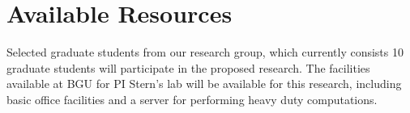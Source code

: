 \documentclass[11pt]{article}
\begin{document}

\section{Available Resources}
Selected graduate students from our research group, which  currently consists 10 graduate students will participate in the proposed research. The facilities available at BGU for PI Stern's lab will be available for this research, including basic office facilities and a server for performing heavy duty computations. 







\end{document}
